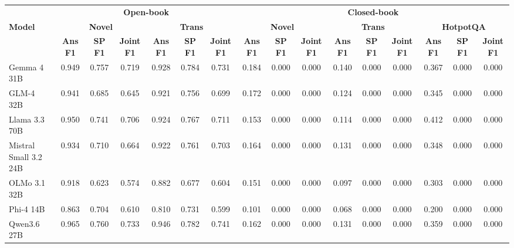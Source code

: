 \begin{tabular}{l|ccc|ccc||ccc|ccc|ccc}
\toprule
& \multicolumn{6}{c||}{\textbf{Open-book}} & \multicolumn{9}{c}{\textbf{Closed-book}} \\
\cmidrule(lr){2-7} \cmidrule(lr){8-16}
\textbf{Model} & \multicolumn{3}{c|}{\textbf{Novel}} & \multicolumn{3}{c||}{\textbf{Trans}} & \multicolumn{3}{c|}{\textbf{Novel}} & \multicolumn{3}{c|}{\textbf{Trans}} & \multicolumn{3}{c}{\textbf{HotpotQA}} \\
& \textbf{Ans F1} & \textbf{SP F1} & \textbf{Joint F1} & \textbf{Ans F1} & \textbf{SP F1} & \textbf{Joint F1} & \textbf{Ans F1} & \textbf{SP F1} & \textbf{Joint F1} & \textbf{Ans F1} & \textbf{SP F1} & \textbf{Joint F1} & \textbf{Ans F1} & \textbf{SP F1} & \textbf{Joint F1} \\
\midrule
Gemma 4 31B & 0.949 & 0.757 & 0.719 & 0.928 & 0.784 & 0.731 & 0.184 & 0.000 & 0.000 & 0.140 & 0.000 & 0.000 & 0.367 & 0.000 & 0.000 \\
GLM-4 32B & 0.941 & 0.685 & 0.645 & 0.921 & 0.756 & 0.699 & 0.172 & 0.000 & 0.000 & 0.124 & 0.000 & 0.000 & 0.345 & 0.000 & 0.000 \\
Llama 3.3 70B & 0.950 & 0.741 & 0.706 & 0.924 & 0.767 & 0.711 & 0.153 & 0.000 & 0.000 & 0.114 & 0.000 & 0.000 & 0.412 & 0.000 & 0.000 \\
Mistral Small 3.2 24B & 0.934 & 0.710 & 0.664 & 0.922 & 0.761 & 0.703 & 0.164 & 0.000 & 0.000 & 0.131 & 0.000 & 0.000 & 0.348 & 0.000 & 0.000 \\
OLMo 3.1 32B & 0.918 & 0.623 & 0.574 & 0.882 & 0.677 & 0.604 & 0.151 & 0.000 & 0.000 & 0.097 & 0.000 & 0.000 & 0.303 & 0.000 & 0.000 \\
Phi-4 14B & 0.863 & 0.704 & 0.610 & 0.810 & 0.731 & 0.599 & 0.101 & 0.000 & 0.000 & 0.068 & 0.000 & 0.000 & 0.200 & 0.000 & 0.000 \\
Qwen3.6 27B & 0.965 & 0.760 & 0.733 & 0.946 & 0.782 & 0.741 & 0.162 & 0.000 & 0.000 & 0.131 & 0.000 & 0.000 & 0.359 & 0.000 & 0.000 \\
\bottomrule
\end{tabular}

